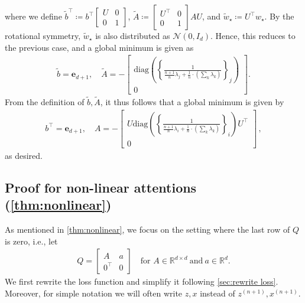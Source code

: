 \documentclass{article}
\newcommand{\R}{\mathbb{R}}
\newcommand{\bb}{A}
\newcommand{\cc}{b}
\newcommand{\ttbb}{\widetilde{\bb}}
\newcommand{\ttcc}{\widetilde{\cc}}
\newcommand{\wstar}{w_\star}
\newcommand{\twstar}{\widetilde{w}_\star}
\newcommand{\tz}[1]{{z^{(#1)}}}
\newcommand{\tx}[1]{x^{(#1)}}
\newcommand{\e}{\mathbf{e}}
\begin{document}
where we define $\ttcc^\top  \coloneqq \cc^\top \begin{bmatrix}U & 0 \\0 & 1\end{bmatrix}$, $\ttbb\coloneqq \begin{bmatrix}U^\top & 0 \\0 & 1\end{bmatrix}\bb U$, and $\twstar \coloneqq U^\top \wstar$.
By the rotational symmetry, $\twstar$ is also distributed as $\mathcal{N}(0, I_d)$.
Hence, this reduces to the previous case, and a global minimum is given as  
\begin{align}
\ttcc = \e_{d+1},\quad \ttbb =  - \begin{bmatrix}
\mathrm{diag}\left(\left\{\frac{1}{  \frac{n+1}{n}  \lambda_j +   \frac{1}{n} \cdot \left( \sum_k \lambda_k  \right)   } \right\}_j\right)   \\
0  
\end{bmatrix} .
\end{align}
From the definition of $\ttcc,\ttbb$, it thus follows that a global minimum is given by
\begin{align}      \cc^\top = \e_{d+1} ,\quad \bb =  - \begin{bmatrix}
U \mathrm{diag}\left(\left\{\frac{1}{  \frac{n+1}{n}  \lambda_i +   \frac{1}{n} \cdot \left( \sum_k \lambda_k  \right)   } \right\}_i\right) U^\top \\
0  
\end{bmatrix}\,,
\end{align}
as desired.
 
 

\subsection{Proof for non-linear attentions (\autoref{thm:nonlinear})}
\label{pf:nonlinear}

As mentioned in  \autoref{thm:nonlinear}, we focus on the setting where the last row of $Q$ is zero, i.e., let
\begin{align}
Q = \begin{bmatrix} A & a  \\
0^\top & 0 \end{bmatrix}\quad \text{for }A\in \R^{d\times d}~\text{and}~a \in \R^d.
\end{align}
We first rewrite the loss function and simplify it 
following \autoref{sec:rewrite loss}.
Moreover, for simple notation we will often write $z,x$ instead of  $\tz{n+1},\tx{n+1}$.
\end{document}
